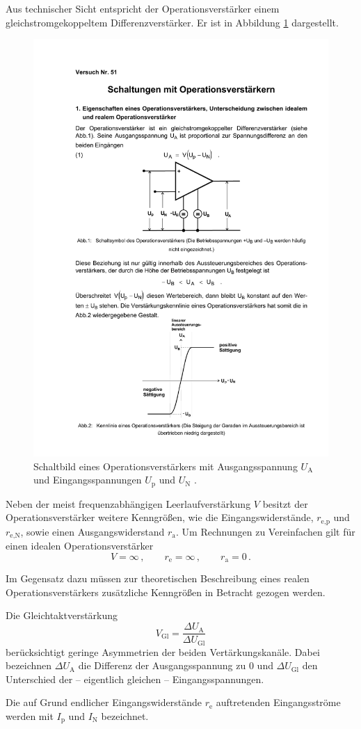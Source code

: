 Aus technischer Sicht entspricht der Operationsverstärker einem
gleichstromgekoppeltem Differenzverstärker. Er ist in Abbildung
\ref{fig:op} dargestellt.
\begin{figure}
    \centering
    \includegraphics[width=0.7\linewidth]{img/op.pdf}
    \caption{
        Schaltbild eines Operationsverstärkers mit Ausgangsspannung
        $U_\text{A}$ und Eingangsspannungen $U_\text{p}$ und
        $U_\text{N}$ \cite{V51}.
    }
    \label{fig:op}
\end{figure}
Neben der meist frequenzabhängigen Leerlaufverstärkung $V$ besitzt der
Operationsverstärker weitere Kenngrößen, wie die Eingangswiderstände,
$r_\text{e,p}$ und $r_\text{e,N}$, sowie 
einen Ausgangswiderstand $r_\text{a}$.
Um Rechnungen zu Vereinfachen gilt für einen idealen Operationsverstärker
\begin{equation}
\label{eq:id-verstärker}
    V = \infty\,,\qquad r_\text{e} = \infty\,,\qquad r_\text{a} = 0\,.
\end{equation}

Im Gegensatz dazu müssen zur theoretischen Beschreibung eines realen
Operationsverstärkers zusätzliche Kenngrößen in Betracht gezogen werden.

Die Gleichtaktverstärkung
\begin{equation}
\label{eq:gleichtaktverstärkung}
    V_\text{Gl} = \frac{\Delta U_\text{A}}{\Delta U_\text{Gl}}
\end{equation}
berücksichtigt geringe Asymmetrien der beiden Vertärkungskanäle.
Dabei bezeichnen $\Delta U_\text{A}$ die Differenz der Ausgangsspannung zu
\num{0} und $\Delta U_\text{Gl}$ den Unterschied der -- eigentlich gleichen --
Eingangsspannungen.

Die auf Grund endlicher Eingangswiderstände $r_\text{e}$ auftretenden
Eingangsströme werden mit $I_\text{p}$ und $I_\text{N}$ bezeichnet.
